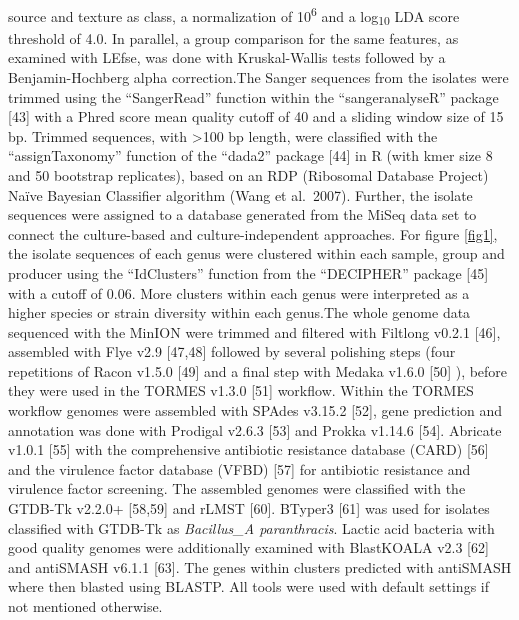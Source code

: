 \documentclass[preprint,3p,
a4paper]{elsarticle} %
\begin{document}
source and texture as class, a normalization of 10\textsuperscript{6}
and a log\textsubscript{10} LDA score threshold of 4.0. In parallel, a
group comparison for the same features, as examined with LEfse, was done
with Kruskal-Wallis tests followed by a Benjamin-Hochberg alpha
correction.\newline  The Sanger sequences from the isolates were trimmed
using the ``SangerRead'' function within the ``sangeranalyseR'' package
{[}43{]} with a Phred score mean quality cutoff of 40 and a sliding
window size of 15 bp. Trimmed sequences, with \textgreater100 bp length,
were classified with the ``assignTaxonomy'' function of the ``dada2''
package {[}44{]} in R (with kmer size 8 and 50 bootstrap replicates),
based on an RDP (Ribosomal Database Project) Naïve Bayesian Classifier
algorithm (Wang et al.~2007). Further, the isolate sequences were
assigned to a database generated from the MiSeq data set to connect the
culture-based and culture-independent approaches. For figure \ref{fig1},
the isolate sequences of each genus were clustered within each sample,
group and producer using the ``IdClusters'' function from the
``DECIPHER'' package {[}45{]} with a cutoff of 0.06. More clusters
within each genus were interpreted as a higher species or strain
diversity within each genus.\newline The whole genome data sequenced
with the MinION were trimmed and filtered with Filtlong v0.2.1 {[}46{]},
assembled with Flye v2.9 {[}47,48{]} followed by several polishing steps
(four repetitions of Racon v1.5.0 {[}49{]} and a final step with Medaka
v1.6.0 {[}50{]} ), before they were used in the TORMES v1.3.0 {[}51{]}
workflow. Within the TORMES workflow genomes were assembled with SPAdes
v3.15.2 {[}52{]}, gene prediction and annotation was done with Prodigal
v2.6.3 {[}53{]} and Prokka v1.14.6 {[}54{]}. Abricate v1.0.1 {[}55{]}
with the comprehensive antibiotic resistance database (CARD) {[}56{]}
and the virulence factor database (VFBD) {[}57{]} for antibiotic
resistance and virulence factor screening. The assembled genomes were
classified with the GTDB-Tk v2.2.0+ {[}58,59{]} and rLMST {[}60{]}.
BTyper3 {[}61{]} was used for isolates classified with GTDB-Tk as
\emph{Bacillus\_A paranthracis}. Lactic acid bacteria with good quality
genomes were additionally examined with BlastKOALA v2.3 {[}62{]} and
antiSMASH v6.1.1 {[}63{]}. The genes within clusters predicted with
antiSMASH where then blasted using BLASTP. All tools were used with
default settings if not mentioned otherwise.
\end{document}
